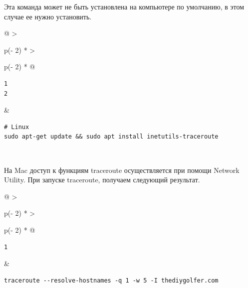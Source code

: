\documentclass{article}
\begin{document}
Эта команда может не быть установлена на компьютере по умолчанию, в этом
случае ее нужно установить.

\begin{longtable}[]{@{}
  >{\raggedright\arraybackslash}p{(\columnwidth - 2\tabcolsep) * }
  >{\raggedright\arraybackslash}p{(\columnwidth - 2\tabcolsep) * }@{}}
\toprule
\endhead
\begin{minipage}[t]{\linewidth}\raggedright
\begin{verbatim}
1
2
\end{verbatim}
\end{minipage} & \begin{minipage}[t]{\linewidth}\raggedright
\begin{verbatim}
# Linux
sudo apt-get update && sudo apt install inetutils-traceroute
\end{verbatim}
\end{minipage} \\ \addlinespace
\bottomrule
\end{longtable}

На Mac доступ к функциям traceroute осуществляется при помощи Network
Utility. При запуске traceroute, получаем следующий результат.

\begin{longtable}[]{@{}
  >{\raggedright\arraybackslash}p{(\columnwidth - 2\tabcolsep) * }
  >{\raggedright\arraybackslash}p{(\columnwidth - 2\tabcolsep) * }@{}}
\toprule
\endhead
\begin{minipage}[t]{\linewidth}\raggedright
\begin{verbatim}
1
\end{verbatim}
\end{minipage} & \begin{minipage}[t]{\linewidth}\raggedright
\begin{verbatim}
traceroute --resolve-hostnames -q 1 -w 5 -I thediygolfer.com
\end{verbatim}
\end{minipage} \\ \addlinespace
\bottomrule
\end{longtable}
\end{document}
